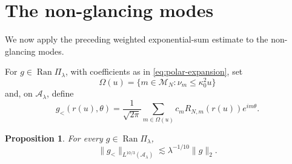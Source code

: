 \documentclass[11pt,a4paper]{amsart}
\newtheorem{proposition}[theorem]{Proposition}
\numberwithin{equation}{section}
\newcommand{\norm}[1]{\lVert #1\rVert}
\begin{document}
\section{The non-glancing  modes}\label{sec:non-glancing}

We now apply the preceding weighted exponential-sum estimate to the non-glancing modes. 

For \(g\in\operatorname{Ran}\Pi_\lambda\), with coefficients as in
\eqref{eq:polar-expansion}, set
\[
 \Omega(u)=\{m\in\mathcal M_N:\nu_m\le\kappa_0^2u\}
\]
and, on \(\mathcal A_\lambda\), define
\begin{equation}\label{eq:ng-definition}
 g_{<}(r(u),\theta)
 =\frac1{\sqrt{2\pi}}\sum_{m\in\Omega(u)}
 c_mR_{N,m}(r(u))e^{im\theta}.
\end{equation}

\begin{proposition}\label{prop:below-threshold}
For every \(g\in\operatorname{Ran}\Pi_\lambda\),
\[
 \norm{g_{<}}_{L^{10/3}(\mathcal A_\lambda)}
 \lesssim\lambda^{-1/10}\norm g_2.
\]
\end{proposition}
\end{document}
